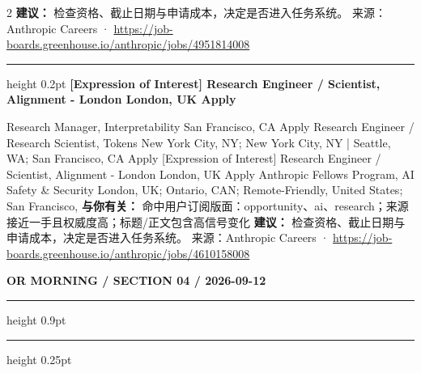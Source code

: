 \documentclass[10.5pt]{ctexart}
\begin{document}
\begin{multicols}{2}
\textbf{建议：} 检查资格、截止日期与申请成本，决定是否进入任务系统。
{\footnotesize\color{ormuted} 来源：Anthropic Careers · \url{https://job-boards.greenhouse.io/anthropic/jobs/4951814008}}
\vspace{2mm}
\hrule height 0.2pt
\vspace{2mm}
{\large\bfseries [Expression of Interest] Research Engineer / Scientist, Alignment - London London, UK Apply}\par
[Expression of Interest] Research Manager, Interpretability San Francisco, CA Apply Research Engineer / Research Scientist, Tokens New York City, NY; New York City, NY | Seattle, WA; San Francisco, CA Apply [Expression of Interest] Research Engineer / Scientist, Alignment - London London, UK Apply Anthropic Fellows Program, AI Safety \& Security London, UK; Ontario, CAN; Remote-Friendly, United States; San Francisco, 
\textbf{与你有关：} 命中用户订阅版面：opportunity、ai、research；来源接近一手且权威度高；标题/正文包含高信号变化
\textbf{建议：} 检查资格、截止日期与申请成本，决定是否进入任务系统。
{\footnotesize\color{ormuted} 来源：Anthropic Careers · \url{https://job-boards.greenhouse.io/anthropic/jobs/4610158008}}
\end{multicols}
\newpage
{\small\bfseries OR MORNING / SECTION 04 / 2026-09-12}
\vspace{2mm}
\hrule height 0.9pt
\vspace{1.5mm}
\hrule height 0.25pt
\vspace{4mm}
\end{document}
